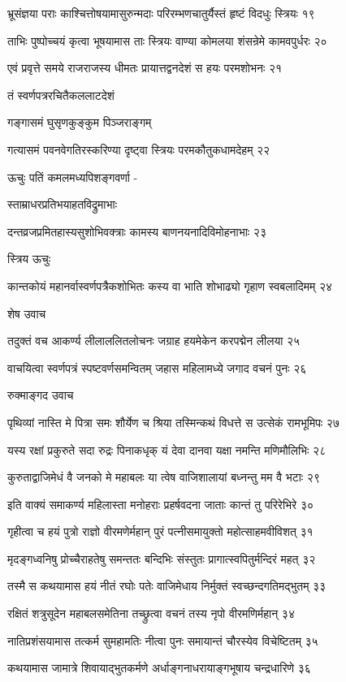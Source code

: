 भ्रूसंज्ञया पराः काश्चित्तोषयामासुरुन्मदाः
परिरम्भणचातुर्यैस्तं हृष्टं विदधुः स्त्रियः १९

ताभिः पुष्पोच्चयं कृत्वा भूषयामास ताः स्त्रियः
वाण्या कोमलया शंसन्रेमे कामवपुर्धरः २०

एवं प्रवृत्ते समये राजराजस्य धीमतः
प्रायात्तद्वनदेशं स हयः परमशोभनः २१

तं स्वर्णपत्ररचितैकललाटदेशं

गङ्गासमं घुसृणकुङ्कुम पिञ्जराङ्गम्

गत्यासमं पवनवेगतिरस्करिण्या
दृष्ट्वा स्त्रियः परमकौतुकधामदेहम् २२

ऊचुः पतिं कमलमध्यपिशङ्गवर्णा -

स्ताम्राधरप्रतिभयाहतविद्रुमाभाः

दन्तव्रजप्रमितहास्यसुशोभिवक्त्राः
कामस्य बाणनयनादिविमोहनाभाः २३

स्त्रिय ऊचुः

कान्तकोयं महानर्वास्वर्णपत्रैकशोभितः
कस्य वा भाति शोभाढ्यो गृहाण स्वबलादिमम् २४

शेष उवाच

तदुक्तं वच आकर्ण्य लीलाललितलोचनः
जग्राह हयमेकेन करपद्मेन लीलया २५

वाचयित्वा स्वर्णपत्रं स्पष्टवर्णसमन्वितम्
जहास महिलामध्ये जगाद वचनं पुनः २६

रुक्माङ्गद उवाच

पृथिव्यां नास्ति मे पित्रा समः शौर्येण च श्रिया
तस्मिन्कथं विधत्ते स उत्सेकं रामभूमिपः २७

यस्य रक्षां प्रकुरुते सदा रुद्रः पिनाकधृक्
यं देवा दानवा यक्षा नमन्ति मणिमौलिभिः २८

कुरुताद्वाजिमेधं वै जनको मे महाबलः
या त्वेष वाजिशालायां बध्नन्तु मम वै भटाः २९

इति वाक्यं समाकर्ण्य महिलास्ता मनोहराः
प्रहर्षवदना जाताः कान्तं तु परिरेभिरे ३०

गृहीत्वा च हयं पुत्रो राज्ञो वीरमणेर्महान्
पुरं पत्नीसमायुक्तो महोत्साहमवीविशत् ३१

मृदङ्गध्वनिषु प्रोच्चैराहतेषु समन्ततः
बन्दिभिः संस्तुतः प्रागात्स्वपितुर्मन्दिरं महत् ३२

तस्मै स कथयामास हयं नीतं रघोः पतेः
वाजिमेधाय निर्मुक्तं स्वच्छन्दगतिमद्भुतम् ३३

रक्षितं शत्रुसूदेन महाबलसमेतिना
तच्छ्रुत्वा वचनं तस्य नृपो वीरमणिर्महान् ३४

नातिप्रशंसयामास तत्कर्म सुमहामतिः
नीत्वा पुनः समायान्तं चौरस्येव विचेष्टितम् ३५

कथयामास जामात्रे शिवायाद्भुतकर्मणे
अर्धाङ्गनाधरायाङ्गभूषाय चन्द्रधारिणे ३६


